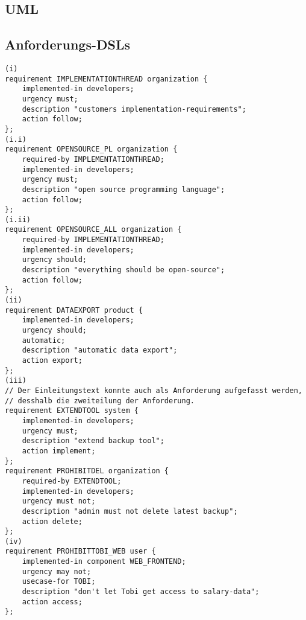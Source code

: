 \documentclass{article}
\begin{document}
\newpage
\subsection{UML}
\newpage

\subsection{Anforderungs-DSLs}
\begin{verbatim}
(i)
requirement IMPLEMENTATIONTHREAD organization {
    implemented-in developers;
    urgency must;
    description "customers implementation-requirements";
    action follow;
};
(i.i)
requirement OPENSOURCE_PL organization {
    required-by IMPLEMENTATIONTHREAD;
    implemented-in developers;
    urgency must;
    description "open source programming language";
    action follow;
};
(i.ii)
requirement OPENSOURCE_ALL organization {
    required-by IMPLEMENTATIONTHREAD;
    implemented-in developers;
    urgency should;
    description "everything should be open-source";
    action follow;
};
(ii)
requirement DATAEXPORT product {
    implemented-in developers;
    urgency should;
    automatic;
    description "automatic data export";
    action export;
};
(iii)
// Der Einleitungstext konnte auch als Anforderung aufgefasst werden, 
// desshalb die zweiteilung der Anforderung.
requirement EXTENDTOOL system {
    implemented-in developers;
    urgency must;
    description "extend backup tool";
    action implement;
};
requirement PROHIBITDEL organization {
    required-by EXTENDTOOL;
    implemented-in developers;
    urgency must not;
    description "admin must not delete latest backup";
    action delete;
};
(iv)
requirement PROHIBITTOBI_WEB user {
    implemented-in component WEB_FRONTEND;
    urgency may not;
    usecase-for TOBI;
    description "don't let Tobi get access to salary-data";
    action access;
};
\end{verbatim}
\end{document}
